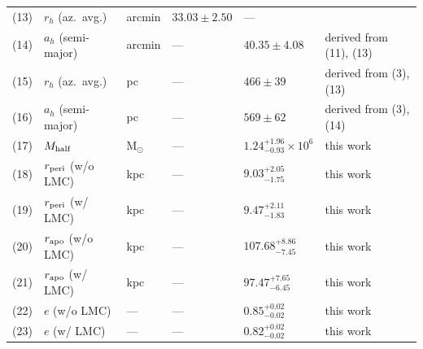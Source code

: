\begin{table}[ht]
\begin{tabular}{c l l l l l}
(13) & $r_h$ (az.\ avg.)             & arcmin        & $33.03 \pm 2.50$           & ---                            & \citet{Moskowitz2020} \\
(14) & $a_h$ (semi-major)            & arcmin        & ---                        & $40.35 \pm 4.08$               & derived from (11), (13) \\
(15) & $r_h$ (az.\ avg.)             & pc            & ---                        & $466 \pm 39$                   & derived from (3), (13) \\
(16) & $a_h$ (semi-major)            & pc            & ---                        & $569 \pm 62$                   & derived from (3), (14) \\
(17) & $M_{\rm half}$                & $\mathrm{M}_\odot$ & ---                   & $1.24^{+1.96}_{-0.93}\times 10^6$ & this work \\
(18) & $r_{\rm peri}$ (w/o LMC)      & kpc           & ---                        & $9.03^{+2.05}_{-1.75}$  & this work \\
(19) & $r_{\rm peri}$ (w/ LMC)       & kpc           & ---                        & $9.47^{+2.11}_{-1.83}$  & this work \\
(20) & $r_{\rm apo}$ (w/o LMC)       & kpc           & ---                        & $107.68^{+8.86}_{-7.45}$ & this work \\
(21) & $r_{\rm apo}$ (w/ LMC)        & kpc           & ---                        & $97.47^{+7.65}_{-6.45}$ & this work \\
(22) & $e$ (w/o LMC)                 & ---           & ---                        & $0.85^{+0.02}_{-0.02}$  & this work \\
(23) & $e$ (w/ LMC)                  & ---           & ---                        & $0.82^{+0.02}_{-0.02}$  & this work \\
\hline
\end{tabular}


\end{table}
